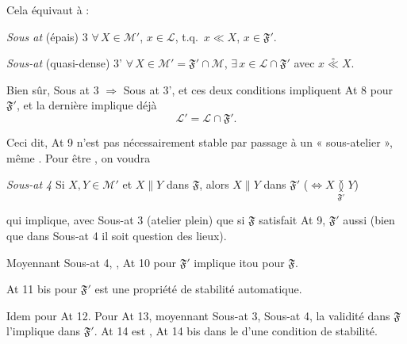 \documentclass[11pt,a4paper]{article}
\begin{document}
Cela équivaut à :

\emph{Sous at} (épais) 3 \quad $\forall\, X \in \mathcal{M}'$, $x \in \mathcal{L}$, t.q.\ $x \ll X$, $x \in \mathfrak{F}'$.

  

\emph{Sous-at} (quasi-dense) 3' \quad $\forall\, X \in \mathcal{M}' = \mathfrak{F}' \cap \mathcal{M}$, $\exists\, x \in \mathcal{L} \cap \mathfrak{F}'$ avec $x \mathrel{\overset{\circ}{\ll}} X$.

Bien sûr, Sous at 3 $\Longrightarrow$ Sous at 3', et ces deux conditions impliquent At 8 pour $\mathfrak{F}'$, et la dernière implique déjà \struck{\ill{}}
\[
  \mathcal{L}' = \mathcal{L} \cap \mathfrak{F}' .
\]

Ceci dit, At 9 n'est pas nécessairement stable par passage à un « sous-atelier », même . Pour être , on voudra \add{\ill{}}

\emph{Sous-at 4} \quad Si $X, Y \in \mathcal{M}'$ et $X \parallel Y$ dans $\mathfrak{F}$, alors $X \parallel Y$ dans $\mathfrak{F}'$ ($\Leftrightarrow X \underset{\mathfrak{F}'}{\between} Y$)


qui \ill{} implique, \struck{\ill{}} avec Sous-at 3 (atelier plein) que si $\mathfrak{F}$ satisfait At 9, $\mathfrak{F}'$ aussi (bien que dans Sous-at 4 il soit question des lieux).

Moyennant Sous-at 4, , \struck{\ill{}} At 10 pour $\mathfrak{F}'$ implique  itou pour $\mathfrak{F}$.

At 11 bis pour $\mathfrak{F}'$ est une propriété de stabilité  \ill{} automatique.

Idem pour At 12. Pour At 13, \struck{\ill{}} moyennant Sous-at 3, Sous-at 4, la validité dans $\mathfrak{F}$ l'implique dans $\mathfrak{F}'$. At 14 est , At 14 bis dans le \ill{} d'une condition de stabilité.

\end{document}
